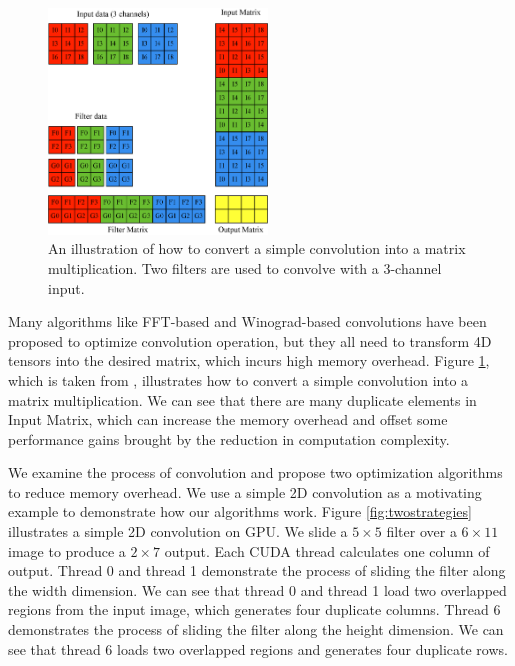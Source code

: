 \documentclass[sigplan,review,anonymous]{acmart}\settopmatter{printfolios=true,printccs=false,printacmref=false}
\begin{document}
\begin{figure}
\centering
  \includegraphics[width=0.75\columnwidth,height=6cm]{./figure/convlowering.eps}
  \caption{An illustration of how to convert a simple convolution into a matrix multiplication. Two filters are used to convolve with a 3-channel input.}
  \label{fig:convlowering}
\end{figure}

Many algorithms like FFT-based and Winograd-based convolutions have been proposed to optimize convolution operation, but they all need to transform 4D tensors into the desired matrix, which incurs high memory overhead. Figure \ref{fig:convlowering}, which is taken from \cite{ChetlurWVCTCS14}, illustrates how to convert a simple convolution into a matrix multiplication. We can see that there are many duplicate elements in Input Matrix, which can increase the memory overhead and offset some performance gains brought by the reduction in computation complexity. 

We examine the process of convolution and propose two optimization algorithms to reduce memory overhead. We use a simple 2D convolution as a motivating example to demonstrate how our algorithms work. Figure \ref{fig:twostrategies} illustrates a simple 2D convolution on GPU. We slide a $5 \times 5$ filter over a $6 \times 11$ image to produce a $2 \times 7$ output. Each CUDA thread calculates one column of output. Thread 0 and thread 1 demonstrate the process of sliding the filter along the width dimension. We can see that thread 0 and thread 1 load two overlapped regions from the input image, which generates four duplicate columns. Thread 6 demonstrates the process of sliding the filter along the height dimension. We can see that thread 6 loads two overlapped regions and generates four duplicate rows.
\end{document}
